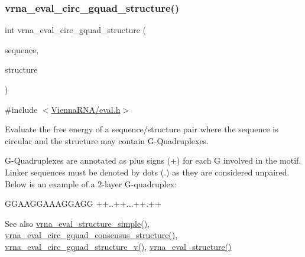 \subsubsection{\texorpdfstring{vrna\+\_\+eval\+\_\+circ\+\_\+gquad\+\_\+structure()}{vrna\_eval\_circ\_gquad\_structure()}}
{\footnotesize\ttfamily int vrna\+\_\+eval\+\_\+circ\+\_\+gquad\+\_\+structure (\begin{DoxyParamCaption}\item[{const char $\ast$}]{sequence,  }\item[{const char $\ast$}]{structure }\end{DoxyParamCaption})}



{\ttfamily \#include $<$\mbox{\hyperlink{eval_8h}{Vienna\+R\+N\+A/eval.\+h}}$>$}



Evaluate the free energy of a sequence/structure pair where the sequence is circular and the structure may contain G-\/\+Quadruplexes. 

G-\/\+Quadruplexes are annotated as plus signs (\textquotesingle{}+\textquotesingle{}) for each G involved in the motif. Linker sequences must be denoted by dots (\textquotesingle{}.\textquotesingle{}) as they are considered unpaired. Below is an example of a 2-\/layer G-\/quadruplex\+: 
\begin{DoxyCode}
GGAAGGAAAGGAGG
++..++...++.++
\end{DoxyCode}


\begin{DoxySeeAlso}{See also}
\mbox{\hyperlink{group__eval_ga7e5273464b775d4130245681312c1369}{vrna\+\_\+eval\+\_\+structure\+\_\+simple()}}, \mbox{\hyperlink{group__eval_gac673ebb9ae2a29f54d201e2ac5b85540}{vrna\+\_\+eval\+\_\+circ\+\_\+gquad\+\_\+consensus\+\_\+structure()}}, \mbox{\hyperlink{group__eval_gab96a6c59923ff06c35f8c2fd2c239727}{vrna\+\_\+eval\+\_\+circ\+\_\+gquad\+\_\+structure\+\_\+v()}}, \mbox{\hyperlink{group__eval_ga58f199f1438d794a265f3b27fc8ea631}{vrna\+\_\+eval\+\_\+structure()}}
\end{DoxySeeAlso}


